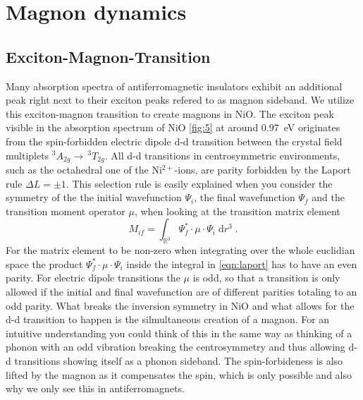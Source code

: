 \section{Magnon dynamics} 
\subsection{Exciton-Magnon-Transition}
\label{sec:x_m}
Many absorption spectra of antiferromagnetic insulators exhibit an additional peak right next to their exciton peaks  refered to as magnon sideband.
We utilize this exciton-magnon transition to create magnons in NiO.
The exciton peak visible in the absorption spectrum of NiO \autoref{fig:5} at around \qty{0.97}{eV} originates from the spin-forbidden electric dipole d-d transition between the crystal field multiplets $^3A_{2g} \rightarrow \, ^3T_{2g}$.
All d-d transitions in centrosymmetric environments, such as the octahedral one of the Ni$^{2+}$-ions, are parity forbidden by the Laport rule $\Delta L = \pm 1$.
This selection rule is easily explained when you consider the symmetry of the the initial wavefunction $\Psi_i$, the final wavefunction $\Psi_f$ and the transition moment operator $\mu$, when looking at the transition matrix element
\begin{equation}
    M_{if} = \int_{\mathbb{R}^3} \Psi^*_f \cdot \mu \cdot \Psi_i \;\text{d}r^3 \;.
    \label{eqn:laport}
\end{equation}
For the matrix element to be non-zero when integrating over the whole euclidian space the product $\Psi^*_f \cdot \mu \cdot \Psi_i$ inside the integral in \autoref{eqn:laport} has to have an even parity.
For electric dipole transitions the $\mu$ is odd, so that a transition is only allowed if the initial and final wavefunction are of different parities totaling to an odd parity.
What breaks the inversion symmetry in NiO and what allows for the d-d transition to happen is the silmultaneous creation of a magnon.
For an intuitive understanding you could think of this in the same way as thinking of a phonon with an odd vibration breaking the centrosymmetry and thus allowing d-d transitions showing itself as a phonon sideband.
The spin-forbideness is also lifted by the magnon as it compensates the spin, which is only possible and also why we only see this in antiferromagnets.
